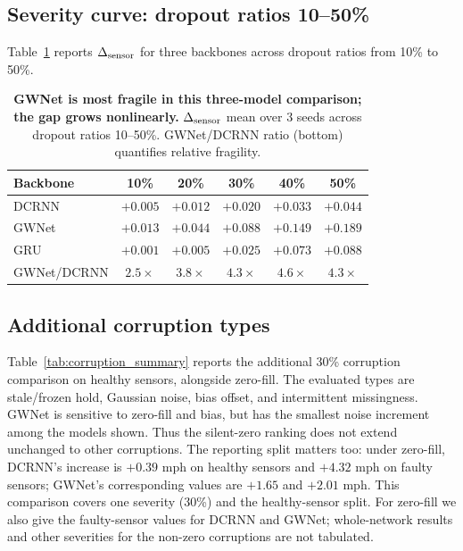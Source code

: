 \subsection{Severity curve: dropout ratios 10--50\%}
\label{sec:appendix_severity}

Table~\ref{tab:sweep} reports $\Delta_{\text{sensor}}$ for three backbones across dropout
ratios from 10\% to 50\%.

\begin{table}[h]
\centering
\caption{\textbf{GWNet is most fragile in this three-model comparison; the gap grows
nonlinearly.} $\Delta_{\text{sensor}}$ mean over 3 seeds across dropout ratios 10--50\%.
GWNet/DCRNN ratio (bottom) quantifies relative fragility.}
\label{tab:sweep}
\vskip 0.05in
\begin{tabular}{lccccc}
\toprule
\textbf{Backbone} & \textbf{10\%} & \textbf{20\%} & \textbf{30\%} & \textbf{40\%} & \textbf{50\%} \\
\midrule
DCRNN & $+0.005$ & $+0.012$ & $+0.020$ & $+0.033$ & $+0.044$ \\
GWNet & $+0.013$ & $+0.044$ & $+0.088$ & $+0.149$ & $+0.189$ \\
GRU   & $+0.001$ & $+0.005$ & $+0.025$ & $+0.073$ & $+0.088$ \\
\midrule
GWNet/DCRNN & $2.5\times$ & $3.8\times$ & $4.3\times$ & $4.6\times$ & $4.3\times$ \\
\bottomrule
\end{tabular}
\end{table}



\subsection{Additional corruption types}
\label{sec:appendix_corruption_suite}

Table~\ref{tab:corruption_summary} reports the additional 30\% corruption
comparison on healthy sensors, alongside zero-fill. The evaluated types are
stale/frozen hold, Gaussian noise, bias offset, and intermittent missingness.
GWNet is sensitive to zero-fill and bias, but has the smallest noise
increment among the models shown. Thus the silent-zero ranking does not
extend unchanged to other corruptions. The reporting split matters too:
under zero-fill, DCRNN's increase is $+0.39$ mph on healthy sensors and
$+4.32$ mph on faulty sensors; GWNet's corresponding values are $+1.65$
and $+2.01$ mph. This comparison covers one severity (30\%) and the
healthy-sensor split. For zero-fill we also give the faulty-sensor values for
DCRNN and GWNet; whole-network results and other severities for the non-zero
corruptions are not tabulated.

